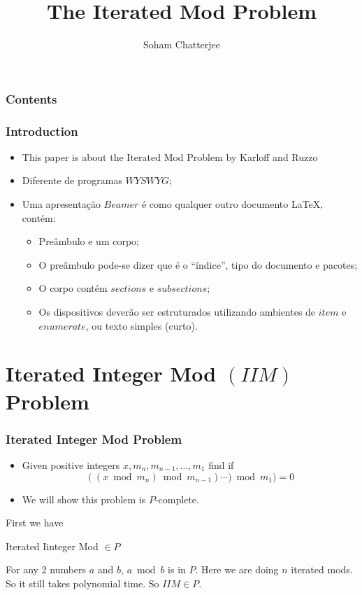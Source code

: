 \documentclass[article,8pt]{beamer}%
\title{The Iterated Mod Problem}
\author{Soham Chatterjee}
\institute{Chennai Mathematical Institute}
\begin{document}
\maketitle


\begin{frame}
    \frametitle{Contents}
    \tableofcontents
\end{frame}



\begin{frame}
    \frametitle{Introduction}
\begin{itemize}
    \item This paper is about the Iterated Mod Problem by Karloff and Ruzzo \cite{iteratedmod}
    \item  Diferente de programas $WYSWYG$;
    \item  Uma apresentação $Beamer$ é como qualquer outro documento LaTeX, contém:
    \begin{itemize}
        \item Preâmbulo e um corpo;
        \item O preâmbulo pode-se dizer que é o ``índice'', tipo do documento e pacotes;
        \item O corpo contém $sections$ e $subsections$;
        \item Os dispositivos deverão ser estruturados utilizando ambientes de $item$ e $enumerate$, ou texto simples (curto).
\end{itemize} 
\end{itemize}
\end{frame}
\section{Iterated Integer Mod $(IIM)$ Problem}
\begin{frame}
	\frametitle{Iterated Integer Mod Problem}
	\begin{itemize}
		\item Given positive integers $x, m_n,m_{n-1},\dots, m_1$  find if $$((x\bmod{m_{n}})\bmod{m_{n-1}})\cdots)\bmod{m_{1}})=0$$
		\item We will show this problem is $P$-complete.
	\end{itemize}
	First we have
		 \begin{theorem}
		Iterated Iinteger Mod $\in P$
	\end{theorem}
	For any 2 numbers $a$ and $b$, $a\bmod{b}$ is in $P$. Here we are doing $n$ iterated mods. So it still takes polynomial time. So $IIM\in P$.
\end{frame}
\end{document}
